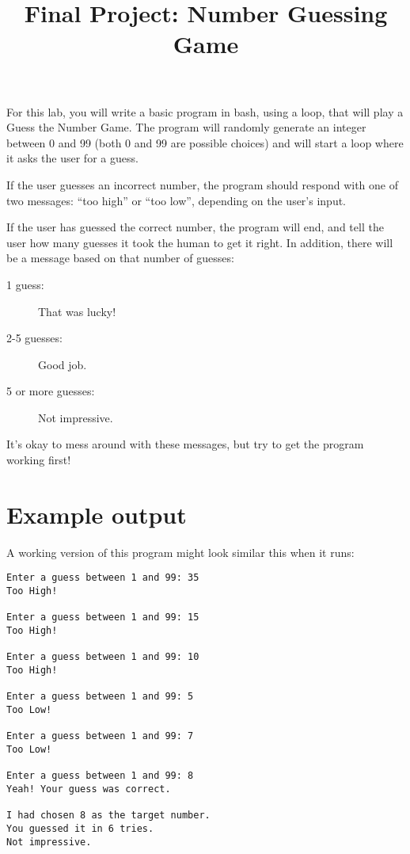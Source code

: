 \documentclass{article}
\title{Final Project: Number Guessing Game}
\author{}
\date{}
\begin{document}
\maketitle
\thispagestyle{empty}

For this lab, you will write a basic program in bash, using a loop, that will
play a Guess the Number Game. The program will randomly generate an integer
between 0 and 99 (both 0 and 99 are possible choices) and will start a loop
where it asks the user for a guess.

If the user guesses an incorrect number, the program should respond with one of
two messages: ``too high'' or ``too low'', depending on the user's input.

If the user has guessed the correct number, the program will end, and tell the
user how many guesses it took the human to get it right. In addition, there
will be a message based on that number of guesses:

\begin{description}
    \item[1 guess:] That was lucky!
    \item[2-5 guesses:] Good job.
    \item[5 or more guesses:] Not impressive.
\end{description}

It's okay to mess around with these messages, but try to get the program
working first!

\section*{Example output}
A working version of this program might look similar this when it runs:
\begin{verbatim}
Enter a guess between 1 and 99: 35
Too High!

Enter a guess between 1 and 99: 15
Too High!

Enter a guess between 1 and 99: 10
Too High!

Enter a guess between 1 and 99: 5
Too Low!

Enter a guess between 1 and 99: 7
Too Low!

Enter a guess between 1 and 99: 8
Yeah! Your guess was correct.

I had chosen 8 as the target number.
You guessed it in 6 tries.
Not impressive.
\end{verbatim}
\end{document}
